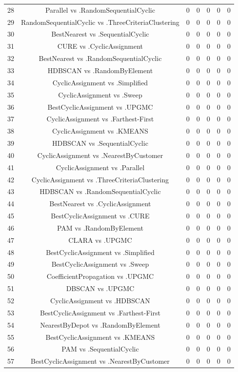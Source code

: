 \documentclass[a4paper,10pt]{article}
\begin{document}
\begin{landscape}
\begin{table}[!htp]
\begin{tabular}{ccccccc}
28&Parallel vs .RandomSequentialCyclic&0&0&0&0&0\\
29&RandomSequentialCyclic vs .ThreeCriteriaClustering&0&0&0&0&0\\
30&BestNearest vs .SequentialCyclic&0&0&0&0&0\\
31&CURE vs .CyclicAssignment&0&0&0&0&0\\
32&BestNearest vs .RandomSequentialCyclic&0&0&0&0&0\\
33&HDBSCAN vs .RandomByElement&0&0&0&0&0\\
34&CyclicAssignment vs .Simplified&0&0&0&0&0\\
35&CyclicAssignment vs .Sweep&0&0&0&0&0\\
36&BestCyclicAssignment vs .UPGMC&0&0&0&0&0\\
37&CyclicAssignment vs .Farthest-First&0&0&0&0&0\\
38&CyclicAssignment vs .KMEANS&0&0&0&0&0\\
39&HDBSCAN vs .SequentialCyclic&0&0&0&0&0\\
40&CyclicAssignment vs .NearestByCustomer&0&0&0&0&0\\
41&CyclicAssignment vs .Parallel&0&0&0&0&0\\
42&CyclicAssignment vs .ThreeCriteriaClustering&0&0&0&0&0\\
43&HDBSCAN vs .RandomSequentialCyclic&0&0&0&0&0\\
44&BestNearest vs .CyclicAssignment&0&0&0&0&0\\
45&BestCyclicAssignment vs .CURE&0&0&0&0&0\\
46&PAM vs .RandomByElement&0&0&0&0&0\\
47&CLARA vs .UPGMC&0&0&0&0&0\\
48&BestCyclicAssignment vs .Simplified&0&0&0&0&0\\
49&BestCyclicAssignment vs .Sweep&0&0&0&0&0\\
50&CoefficientPropagation vs .UPGMC&0&0&0&0&0\\
51&DBSCAN vs .UPGMC&0&0&0&0&0\\
52&CyclicAssignment vs .HDBSCAN&0&0&0&0&0\\
53&BestCyclicAssignment vs .Farthest-First&0&0&0&0&0\\
54&NearestByDepot vs .RandomByElement&0&0&0&0&0\\
55&BestCyclicAssignment vs .KMEANS&0&0&0&0&0\\
56&PAM vs .SequentialCyclic&0&0&0&0&0\\
57&BestCyclicAssignment vs .NearestByCustomer&0&0&0&0&0\\

\end{tabular}
\end{table}
\end{landscape}
\end{document}
